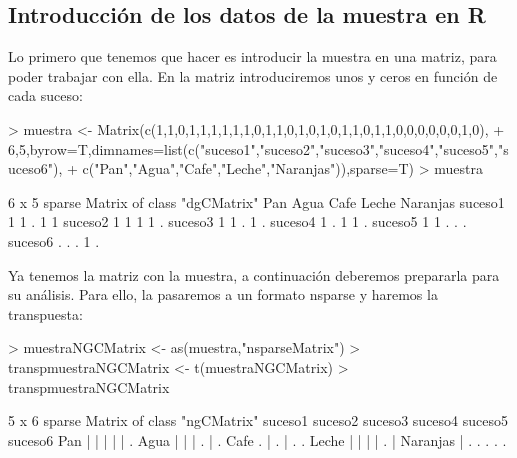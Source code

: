 \documentclass [a4paper] {article}
\begin{document}
\subsection{Introducción de los datos de la muestra en R} 
Lo primero que tenemos que hacer es introducir la muestra en una matriz, para poder trabajar con ella. En la matriz introduciremos unos y ceros en función de cada 
suceso:
\begin{Schunk}
\begin{Sinput}
> muestra <- Matrix(c(1,1,0,1,1,1,1,1,1,0,1,1,0,1,0,1,0,1,1,0,1,1,0,0,0,0,0,0,1,0),
+ 6,5,byrow=T,dimnames=list(c("suceso1","suceso2","suceso3","suceso4","suceso5","suceso6"),
+ c("Pan","Agua","Cafe","Leche","Naranjas")),sparse=T)
> muestra
\end{Sinput}
\begin{Soutput}
6 x 5 sparse Matrix of class "dgCMatrix"
        Pan Agua Cafe Leche Naranjas
suceso1   1    1    .     1        1
suceso2   1    1    1     1        .
suceso3   1    1    .     1        .
suceso4   1    .    1     1        .
suceso5   1    1    .     .        .
suceso6   .    .    .     1        .
\end{Soutput}
\end{Schunk}
Ya tenemos la matriz con la muestra, a continuación deberemos prepararla para su análisis. 
Para ello, la pasaremos a un formato nsparse y haremos la transpuesta:
\begin{Schunk}
\begin{Sinput}
> muestraNGCMatrix <- as(muestra,"nsparseMatrix")
> transpmuestraNGCMatrix <- t(muestraNGCMatrix)
> transpmuestraNGCMatrix
\end{Sinput}
\begin{Soutput}
5 x 6 sparse Matrix of class "ngCMatrix"
         suceso1 suceso2 suceso3 suceso4 suceso5 suceso6
Pan            |       |       |       |       |       .
Agua           |       |       |       .       |       .
Cafe           .       |       .       |       .       .
Leche          |       |       |       |       .       |
Naranjas       |       .       .       .       .       .
\end{Soutput}
\end{Schunk}
\end{document}
